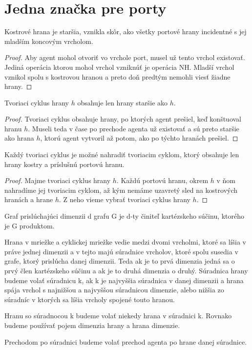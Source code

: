 \section{Jedna značka pre porty}

\begin{lem}
Kostrové hrana je staršia, vznikla skôr, ako všetky portové hrany incidentné
s jej mladším koncovým vrcholom.
\end{lem}
\begin{proof}
Aby agent mohol otvoriť vo vrchole port, musel už tento vrchol existovať.
Jediná operácia ktorou mohol vrchol vzniknúť je operácia NH. Mladší vrchol
vznikol spolu s kostrovou hranou a preto doň predtým nemohli viesť žiadne
hrany.
\end{proof}


\begin{lem}
Tvoriaci cyklus hrany $h$ obsahuje len hrany staršie ako $h$.
\end{lem}
\begin{proof}
Tvoriaci cyklus obsahuje hrany, po ktorých agent prešiel, keď konštuoval
hranu $h$. Museli teda v čase po prechode agenta už existovať a sú preto 
staršie ako hrana $h$, ktorú agent vytvoril až potom, ako po týchto hranách
prešiel.
\end{proof}


\begin{lem}
\label{cyklus}
Každý tvoriaci cyklus je možné nahradiť tvoriacim cyklom, ktorý obsahuje len
hrany kostry a príslušnú portovú hranu.
\end{lem}
\begin{proof}
Majme tvoriaci cyklus hrany $h$. Každú portovú hranu, okrem $h$  v ňom nahradíme 
jej tvoriacim
cyklom, až kým nemáme uzavretý sled na kostrových hranách a hrane $h$. Z
neho vieme vybrať tvoriaci cyklus hrany $h$.
\end{proof}



\begin{ozn}
Graf prislúchajúci dimenzii d grafu G je d-ty činiteľ kartézskeho súčinu, ktorého
je G produktom.
\end{ozn}

\begin{ozn}
Hrana v mriežke a cyklickej mriežke vedie medzi dvomi vrcholmi, 
ktoré sa líšia v práve jednej dimenzii a v tejto majú súradnice vrcholov,
ktoré spolu susedia v grafe, ktorý prislúcha danej dimenzii. Teda ak je to
prvá dimenzia jedná sa o prvý člen kartézskeho súčinu a ak je to druhá
dimenzia o druhý. Súradnica hrany budeme volať súradnicu k, ak k je
najvyššia súradnica v danej dimenzii a hrana spája vrchol s najnižšou a
najvyššou súradnicou dimenzie, alebo nižšia zo súradníc v ktorých sa líšia
vrcholy spojené touto hranou.

Hranu so súradnocou k budeme volať niekedy hrana v súradnici k. Rovnako
budeme používať pojem dimenzia hrany a hrana dimenzie.
\end{ozn}
\begin{ozn}
Prechodom po súradnici budeme volať prechod agenta po hrane danej súradnice.
\end{ozn}

